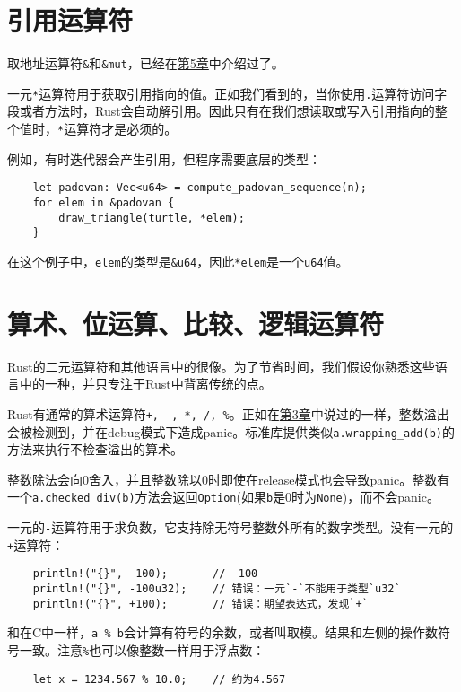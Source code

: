 \section{引用运算符}

取地址运算符\texttt{\&}和\texttt{\&mut}，已经在\hyperref[ch05]{第5章}中介绍过了。

一元\texttt{*}运算符用于获取引用指向的值。正如我们看到的，当你使用\texttt{.}运算符访问字段或者方法时，Rust会自动解引用。因此只有在我们想读取或写入引用指向的整个值时，\texttt{*}运算符才是必须的。

例如，有时迭代器会产生引用，但程序需要底层的类型：
\begin{verbatim}
    let padovan: Vec<u64> = compute_padovan_sequence(n);
    for elem in &padovan {
        draw_triangle(turtle, *elem);
    }
\end{verbatim}

在这个例子中，\texttt{elem}的类型是\texttt{\&u64}，因此\texttt{*elem}是一个\texttt{u64}值。

\section{算术、位运算、比较、逻辑运算符}

Rust的二元运算符和其他语言中的很像。为了节省时间，我们假设你熟悉这些语言中的一种，并只专注于Rust中背离传统的点。

Rust有通常的算术运算符\texttt{+, -, *, /, \%}。正如在\hyperref[ch03]{第3章}中说过的一样，整数溢出会被检测到，并在debug模式下造成panic。标准库提供类似\texttt{a.wrapping\_add(b)}的方法来执行不检查溢出的算术。

整数除法会向0舍入，并且整数除以0时即使在release模式也会导致panic。整数有一个\texttt{a.checked\_div(b)}方法会返回\texttt{Option}(如果\texttt{b}是0时为\texttt{None})，而不会panic。

一元的\texttt{-}运算符用于求负数，它支持除无符号整数外所有的数字类型。没有一元的\texttt{+}运算符：
\begin{verbatim}
    println!("{}", -100);       // -100
    println!("{}", -100u32);    // 错误：一元`-`不能用于类型`u32`
    println!("{}", +100);       // 错误：期望表达式，发现`+`
\end{verbatim}

和在C中一样，\texttt{a \% b}会计算有符号的余数，或者叫取模。结果和左侧的操作数符号一致。注意\texttt{\%}也可以像整数一样用于浮点数：
\begin{verbatim}
    let x = 1234.567 % 10.0;    // 约为4.567
\end{verbatim}

